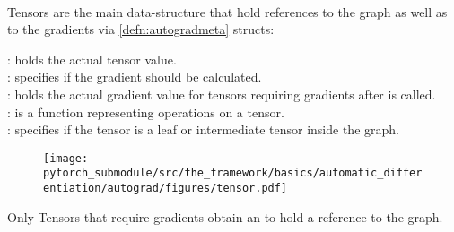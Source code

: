 \begin{defnbox}\nospacing
    \begin{defn}\label{defn:tensors_and_graphs}\leavevmode\\
        Tensors are the main data-structure that hold references to the graph as well as to the gradients
        via \cref{defn:autogradmeta} structs:\\
        \begin{minipage}{0.7\textwidth}
            : holds the actual tensor value.\\
            : specifies if the gradient should be calculated.\\
            : holds the actual gradient value for tensors requiring gradients after  is called.\\
            : is a function representing operations on a tensor.\\
            : specifies if the tensor is a leaf or intermediate tensor inside the graph.
        \end{minipage}\hfill
        \begin{minipage}{0.26\textwidth}
            \begin{figure}[H]
                \centering
                \texttt{[image: pytorch\_submodule/src/the\_framework/basics/automatic\_differentiation/autograd/figures/tensor.pdf]}
            \end{figure}
        \end{minipage}
    \end{defn}
\end{defnbox}
\begin{notebox}[Note]\nospacing
    Only Tensors that require gradients obtain an  to hold a reference to the graph.
\end{notebox}
